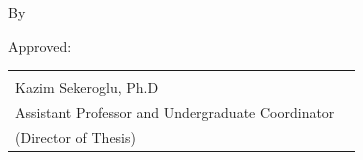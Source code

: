 \documentclass[titlepage]{report}
\newcommand{\graduationdate}{December 5, 2022}
\newcommand{\college}{Science}
\newcommand{\institution}{Southeastern Louisiana University}
\newcommand{\undergradyearcompleted}{2017}
\newcommand{\undergraddegreetype}{Computer Science}
\newcommand{\undergradinstitution}{Southeastern Louisiana University}
\newcommand{\keywords}{Generative Adversarial Networks, Predictive Modeling, EEG}
\begin{document}
	\begin{titlepage}
		\thispagestyle{plain}
		\setcounter{page}{2}
		\begin{center}
			\vspace*{2in}
			
			\thetitle
			
			\vspace{1.5cm}
			
			By
			
			\theauthor
			
			
			\vspace{0.2in}
			
			Approved:
			
			\vspace{0.2in}
			\noindent\begin{tabular}{ll}
				\makebox[2.5in]{\hrulefill}\\
				Kazim Sekeroglu, Ph.D\\Assistant Professor and Undergraduate Coordinator\\(Director of Thesis)
			\end{tabular}
		\end{center}
	\end{titlepage}

	\begin{abstract}
	\vspace*{0.5in}
	\thispagestyle{plain}
	\setcounter{page}{3}
	Name: \theauthor
	
	\noindent Previous degrees: B.S., \undergradinstitution, \undergradyearcompleted, (\undergraddegreetype)
	
	\noindent Date of Current Degree: \graduationdate
	
	\noindent Institution: \institution
	
	\noindent Title of Study: \thetitle
	
	\noindent Pages in Study: \pageref{LastPage}
	
	\noindent Candidate for Degree of Master of \college
	
	The maximum length for a thesis abstract is 150 words. \textbf{Fill in your $\leq 150$ word abstract here.}
	
	\vspace{0.5in}
	
	\noindent Key words: \keywords
	
	\end{abstract}

	\begin{titlepage}
		\thispagestyle{plain}
		\setcounter{page}{4}
		\begin{center}
			\listoffigures
		\end{center}
	\end{titlepage}
	
\end{document}
